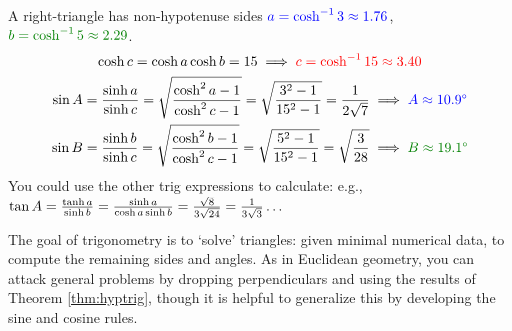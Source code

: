 \begin{example}{}{}
	A right-triangle has non-hypotenuse sides $\textcolor{blue}{a=\cosh^{-1}3\approx 1.76}$, \ $\textcolor{Green}{b=\cosh^{-1}5\approx 2.29}$.
	\begin{gather*}
		\cosh c=\cosh a\cosh b=15\implies \textcolor{red}{c=\cosh^{-1}15\approx 3.40}\\
		\sin A=\frac{\sinh a}{\sinh c} =\sqrt{\frac{\cosh^2a-1}{\cosh^2 c-1}} =\sqrt{\frac{3^2-1}{15^2-1}} =\frac 1{2\sqrt 7} \implies \textcolor{blue}{A\approx \ang{10.9}}\\
		\sin B=\frac{\sinh b}{\sinh c} =\sqrt{\frac{\cosh^2b-1}{\cosh^2 c-1}} =\sqrt{\frac{5^2-1}{15^2-1}}=\sqrt{\frac 3{28}} \implies \textcolor{Green}{B\approx \ang{19.1}}
	\end{gather*}
	You could use the other trig expressions to calculate: e.g., $\tan A=\smash{\frac{\tanh a}{\sinh b}=\frac{\sinh a}{\cosh a\sinh b}=\frac{\sqrt 8}{3\sqrt{24}} =\frac 1{3\sqrt 3} \ldots}$
\end{example}

\goodbreak

The goal of trigonometry is to `solve' triangles: given minimal numerical data, to compute the remaining sides and angles. As in Euclidean geometry, you can attack general problems by dropping perpendiculars and using the results of Theorem \ref{thm:hyptrig}, though it is helpful to generalize this by developing the sine and cosine rules.

